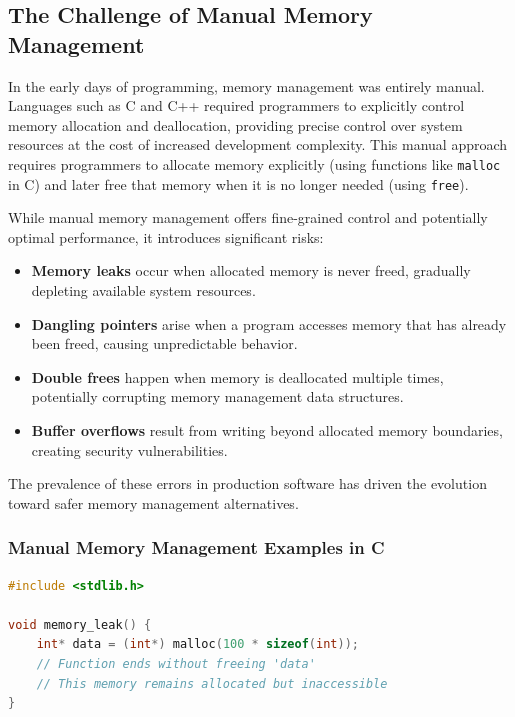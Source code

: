 \subsection{The Challenge of Manual Memory Management}

In the early days of programming, memory management was entirely manual. Languages such as C and C++ required programmers to explicitly control memory allocation and deallocation, providing precise control over system resources at the cost of increased development complexity. This manual approach requires programmers to allocate memory explicitly (using functions like \texttt{malloc} in C) and later free that memory when it is no longer needed (using \texttt{free}).

While manual memory management offers fine-grained control and potentially optimal performance, it introduces significant risks:

\begin{itemize}
    \item \textbf{Memory leaks} occur when allocated memory is never freed, gradually depleting available system resources.
    \item \textbf{Dangling pointers} arise when a program accesses memory that has already been freed, causing unpredictable behavior.
    \item \textbf{Double frees} happen when memory is deallocated multiple times, potentially corrupting memory management data structures.
    \item \textbf{Buffer overflows} result from writing beyond allocated memory boundaries, creating security vulnerabilities.
\end{itemize}

The prevalence of these errors in production software has driven the evolution toward safer memory management alternatives.

\subsubsection*{Manual Memory Management Examples in C}

\begin{lstlisting}[language=C, caption=Memory Leak Example, style=mystyle]
#include <stdlib.h>

void memory_leak() {
    int* data = (int*) malloc(100 * sizeof(int));
    // Function ends without freeing 'data'
    // This memory remains allocated but inaccessible
}
\end{lstlisting}

